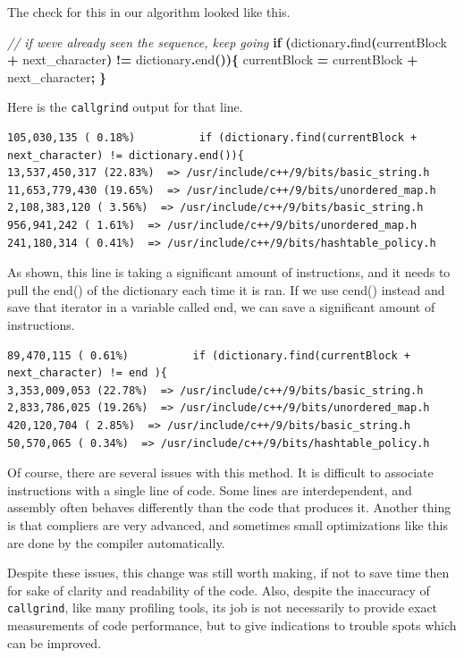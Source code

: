 \documentclass[12pt,twoside]{reedthesis}
\newenvironment{Shaded}{\begin{snugshade}}{\end{snugshade}}
\newcommand{\CommentTok}[1]{\textcolor[rgb]{0.56,0.35,0.01}{\textit{#1}}}
\newcommand{\ControlFlowTok}[1]{\textcolor[rgb]{0.13,0.29,0.53}{\textbf{#1}}}
\newcommand{\NormalTok}[1]{#1}
\newcommand{\OperatorTok}[1]{\textcolor[rgb]{0.81,0.36,0.00}{\textbf{#1}}}
\begin{document}
The check for this in our algorithm looked like this.
\begin{Shaded}
\begin{Highlighting}[]
\CommentTok{// if we\textquotesingle{}ve already seen the sequence, keep going}
\ControlFlowTok{if} \OperatorTok{(}\NormalTok{dictionary}\OperatorTok{.}\NormalTok{find}\OperatorTok{(}\NormalTok{currentBlock }\OperatorTok{+}\NormalTok{ next\_character}\OperatorTok{)} \OperatorTok{!=}\NormalTok{ dictionary}\OperatorTok{.}\NormalTok{end}\OperatorTok{())\{}
\NormalTok{    currentBlock }\OperatorTok{=}\NormalTok{ currentBlock }\OperatorTok{+}\NormalTok{ next\_character}\OperatorTok{;}
\OperatorTok{\}}
\end{Highlighting}
\end{Shaded}
Here is the \texttt{callgrind} output for that line.
\begin{verbatim}
105,030,135 ( 0.18%)          if (dictionary.find(currentBlock + next_character) != dictionary.end()){
13,537,450,317 (22.83%)  => /usr/include/c++/9/bits/basic_string.h
11,653,779,430 (19.65%)  => /usr/include/c++/9/bits/unordered_map.h
2,108,383,120 ( 3.56%)  => /usr/include/c++/9/bits/basic_string.h
956,941,242 ( 1.61%)  => /usr/include/c++/9/bits/unordered_map.h
241,180,314 ( 0.41%)  => /usr/include/c++/9/bits/hashtable_policy.h
\end{verbatim}
As shown, this line is taking a significant amount of instructions, and it needs to pull the end() of the dictionary each time it is ran. If we use cend() instead and save that iterator in a variable called end, we can save a significant amount of instructions.
\begin{verbatim}
89,470,115 ( 0.61%)          if (dictionary.find(currentBlock + next_character) != end ){
3,353,009,053 (22.78%)  => /usr/include/c++/9/bits/basic_string.h
2,833,786,025 (19.26%)  => /usr/include/c++/9/bits/unordered_map.h
420,120,704 ( 2.85%)  => /usr/include/c++/9/bits/basic_string.h
50,570,065 ( 0.34%)  => /usr/include/c++/9/bits/hashtable_policy.h
\end{verbatim}
Of course, there are several issues with this method. It is difficult to associate instructions with a single line of code. Some lines are interdependent, and assembly often behaves differently than the code that produces it. Another thing is that compliers are very advanced, and sometimes small optimizations like this are done by the compiler automatically.

Despite these issues, this change was still worth making, if not to save time then for sake of clarity and readability of the code. Also, despite the inaccuracy of \texttt{callgrind}, like many profiling tools, its job is not necessarily to provide exact measurements of code performance, but to give indications to trouble spots which can be improved.
\end{document}
